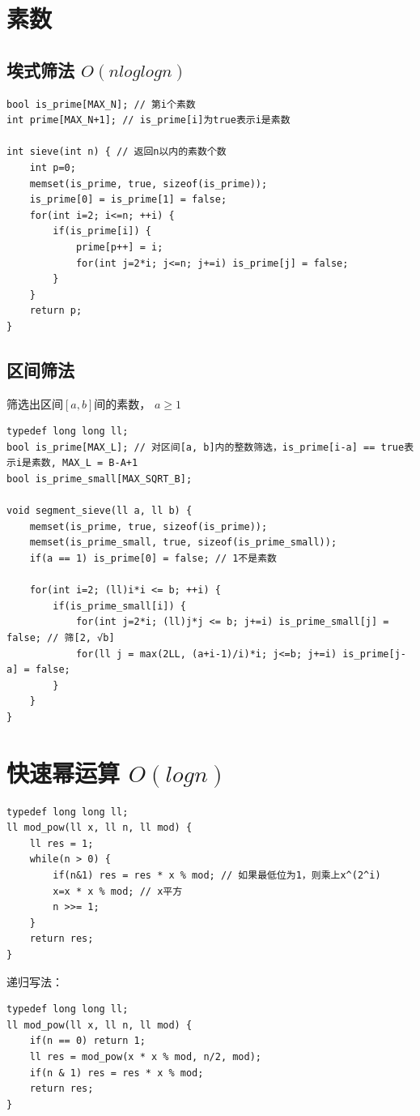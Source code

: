 \documentclass[a4paper]{ctexrep}
\begin{document}
\section{素数}
\subsection{埃式筛法 $O(n log logn)$}
\begin{lstlisting}
bool is_prime[MAX_N]; // 第i个素数
int prime[MAX_N+1]; // is_prime[i]为true表示i是素数

int sieve(int n) { // 返回n以内的素数个数
	int p=0;
	memset(is_prime, true, sizeof(is_prime));
	is_prime[0] = is_prime[1] = false;
	for(int i=2; i<=n; ++i) {
		if(is_prime[i]) {
			prime[p++] = i;
			for(int j=2*i; j<=n; j+=i) is_prime[j] = false;
		}
	}
	return p;
}
\end{lstlisting}

\subsection{区间筛法}
筛选出区间$[a, b]$间的素数， $a \ge 1$

\begin{lstlisting}
typedef long long ll;
bool is_prime[MAX_L]; // 对区间[a, b]内的整数筛选，is_prime[i-a] == true表示i是素数, MAX_L = B-A+1
bool is_prime_small[MAX_SQRT_B]; 

void segment_sieve(ll a, ll b) {
	memset(is_prime, true, sizeof(is_prime)); 
	memset(is_prime_small, true, sizeof(is_prime_small));
	if(a == 1) is_prime[0] = false; // 1不是素数

	for(int i=2; (ll)i*i <= b; ++i) {
		if(is_prime_small[i]) {
			for(int j=2*i; (ll)j*j <= b; j+=i) is_prime_small[j] = false; // 筛[2, √b]
			for(ll j = max(2LL, (a+i-1)/i)*i; j<=b; j+=i) is_prime[j-a] = false;
		}
	}
}
\end{lstlisting}

\section{快速幂运算 $O(log n)$}
\begin{lstlisting}
typedef long long ll;
ll mod_pow(ll x, ll n, ll mod) {
	ll res = 1;
	while(n > 0) {
		if(n&1) res = res * x % mod; // 如果最低位为1，则乘上x^(2^i)
		x=x * x % mod; // x平方
		n >>= 1;
	}
	return res;
}
\end{lstlisting}

递归写法：
\begin{lstlisting}
typedef long long ll;
ll mod_pow(ll x, ll n, ll mod) {
	if(n == 0) return 1;
	ll res = mod_pow(x * x % mod, n/2, mod);
	if(n & 1) res = res * x % mod;
	return res;
}
\end{lstlisting}
\end{document}
